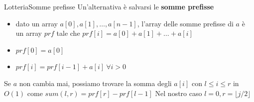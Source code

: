 \documentclass{beamer}
\begin{document}
\begin{frame}
\end{frame}

\begin{frame}[fragile]{Lotteria}{Somme prefisse}
    Un'alternativa \`e salvarsi le \textbf{somme prefisse}
    \pause
    \begin{block}{}
        \begin{itemize}
            \item dato un array $a[0], a[1], \dots, a[n-1]$, l'array delle somme prefisse di $a$ \`e un array $prf$ tale che $prf[i] = a[0] + a[1] + \dots + a[i]$
            \pause
        \item $prf[0] = a[0]$
        \item $prf[i] = prf[i-1] + a[i] \ \forall i > 0$
        \end{itemize}
    \end{block}
    \pause
    Se $a$ non cambia mai, possiamo trovare la somma degli $a[i]$ con $l \leq i \leq r$ in $O(1)$ come $sum(l, r) = prf[r] - prf[l-1]$
    \vfill
    Nel nostro caso $l = 0, r = \lfloor j/2 \rfloor$
\end{frame}
\end{document}
